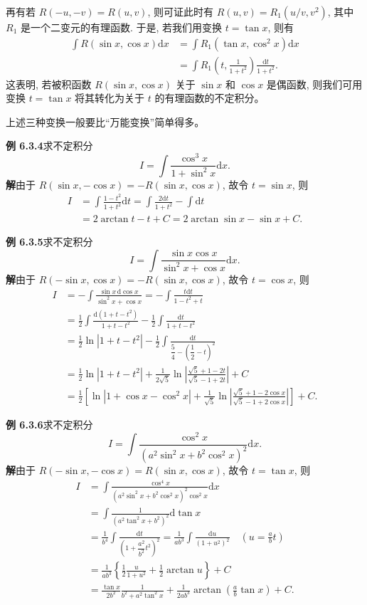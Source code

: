 \documentclass[UTF8,12pt,a4paper,fontset=fandol]{ctexart}
\begin{document}
再有若 $R(-u,-v)=R(u,v)$, 则可证此时有 $R(u,v)=R_1(u/v,v^2)$, 其中 $R_1$ 是一个二变元的有理函数. 于是, 若我们用变换 $t=\tan x$, 则有
\[
\begin{aligned}
  \int R(\sin x,\cos x)\mathrm dx
  &=
  \int R_1(\tan x,\cos^2x)\mathrm dx\\
  &=
  \int R_1\left(t,\frac1{1+t^2}\right)\frac{\mathrm dt}{1+t^2}.
\end{aligned}
\]
这表明, 若被积函数 $R(\sin x,\cos x)$ 关于 $\sin x$ 和 $\cos x$ 是偶函数, 则我们可用变换 $t=\tan x$ 将其转化为关于 $t$ 的有理函数的不定积分。

上述三种变换一般要比``万能变换''简单得多。

\noindent\textbf{例 6.3.4}\quad 求不定积分
\[
  I=\int\frac{\cos^3x}{1+\sin^2x}\mathrm dx.
\]
\noindent\textbf{解}\quad 由于 $R(\sin x,-\cos x)=-R(\sin x,\cos x)$, 故令 $t=\sin x$, 则
\[
\begin{aligned}
  I
  &=
  \int\frac{1-t^2}{1+t^2}\mathrm dt
  =
  \int\frac{2\mathrm dt}{1+t^2}-\int\mathrm dt\\
  &=
  2\arctan t-t+C
  =
  2\arctan\sin x-\sin x+C.
\end{aligned}
\]

\noindent\textbf{例 6.3.5}\quad 求不定积分
\[
  I=\int\frac{\sin x\cos x}{\sin^2x+\cos x}\mathrm dx.
\]
\noindent\textbf{解}\quad 由于 $R(-\sin x,\cos x)=-R(\sin x,\cos x)$, 故令 $t=\cos x$, 则
\[
\begin{aligned}
  I
  &=
  -\int\frac{\sin x\,\mathrm d\cos x}{\sin^2x+\cos x}
  =
  -\int\frac{t\mathrm dt}{1-t^2+t}\\
  &=
  \frac12\int\frac{\mathrm d(1+t-t^2)}{1+t-t^2}
  -\frac12\int\frac{\mathrm dt}{1+t-t^2}\\
  &=
  \frac12\ln|1+t-t^2|-\frac12\int\frac{\mathrm dt}{\dfrac54-\left(\dfrac12-t\right)^2}\\
  &=
  \frac12\ln|1+t-t^2|+
  \frac1{2\sqrt5}\ln\left|\frac{\sqrt5+1-2t}{\sqrt5-1+2t}\right|+C\\
  &=
  \frac12\left[
  \ln|1+\cos x-\cos^2x|+
  \frac1{\sqrt5}\ln\left|\frac{\sqrt5+1-2\cos x}{\sqrt5-1+2\cos x}\right|
  \right]+C.
\end{aligned}
\]

\noindent\textbf{例 6.3.6}\quad 求不定积分
\[
  I=\int\frac{\cos^2x}{(a^2\sin^2x+b^2\cos^2x)^2}\mathrm dx.
\]
\noindent\textbf{解}\quad 由于 $R(-\sin x,-\cos x)=R(\sin x,\cos x)$, 故令 $t=\tan x$, 则
\[
\begin{aligned}
  I
  &=
  \int\frac{\cos^4x}{(a^2\sin^2x+b^2\cos^2x)^2\cos^2x}\mathrm dx\\
  &=
  \int\frac{1}{(a^2\tan^2x+b^2)^2}\mathrm d\tan x\\
  &=
  \frac1{b^4}\int\frac{\mathrm dt}{\left(1+\dfrac{a^2}{b^2}t^2\right)^2}
  =
  \frac1{ab^3}\int\frac{\mathrm du}{(1+u^2)^2}\quad\left(u=\frac abt\right)\\
  &=
  \frac1{ab^3}\left\{\frac12\frac u{1+u^2}+\frac12\arctan u\right\}+C\\
  &=
  \frac{\tan x}{2b^2}\frac1{b^2+a^2\tan^2x}
  +\frac1{2ab^3}\arctan\left(\frac ab\tan x\right)+C.
\end{aligned}
\]
\end{document}
